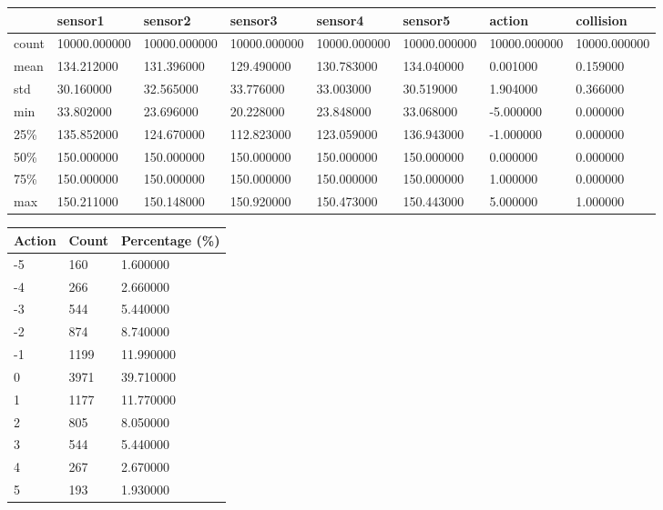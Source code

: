 \bigskip\noindent
\begin{tabular}{p{}p{}p{}p{}p{}p{}p{}p{}}
\toprule
~ & sensor1 & sensor2 & sensor3 & sensor4 & sensor5 & action & collision \\
\hline
count & 10000.000000 & 10000.000000 & 10000.000000 & 10000.000000 & 10000.000000 & 10000.000000 & 10000.000000 \\
\hline
mean & 134.212000 & 131.396000 & 129.490000 & 130.783000 & 134.040000 & 0.001000 & 0.159000 \\
\hline
std & 30.160000 & 32.565000 & 33.776000 & 33.003000 & 30.519000 & 1.904000 & 0.366000 \\
\hline
min & 33.802000 & 23.696000 & 20.228000 & 23.848000 & 33.068000 & -5.000000 & 0.000000 \\
\hline
25\% & 135.852000 & 124.670000 & 112.823000 & 123.059000 & 136.943000 & -1.000000 & 0.000000 \\
\hline
50\% & 150.000000 & 150.000000 & 150.000000 & 150.000000 & 150.000000 & 0.000000 & 0.000000 \\
\hline
75\% & 150.000000 & 150.000000 & 150.000000 & 150.000000 & 150.000000 & 1.000000 & 0.000000 \\
\hline
max & 150.211000 & 150.148000 & 150.920000 & 150.473000 & 150.443000 & 5.000000 & 1.000000 \\
\hline
\bottomrule
\end{tabular}

\bigskip

\bigskip\noindent
\begin{tabular}{p{}p{}p{}}
\toprule
Action & Count & Percentage (\%) \\
\hline
-5 & 160 & 1.600000 \\
-4 & 266 & 2.660000 \\
-3 & 544 & 5.440000 \\
-2 & 874 & 8.740000 \\
-1 & 1199 & 11.990000 \\
0 & 3971 & 39.710000 \\
1 & 1177 & 11.770000 \\
2 & 805 & 8.050000 \\
3 & 544 & 5.440000 \\
4 & 267 & 2.670000 \\
5 & 193 & 1.930000 \\
\bottomrule
\end{tabular}

